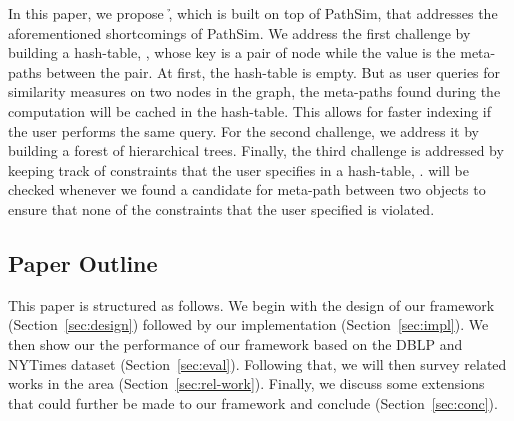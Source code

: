 In this paper, we propose \h, which is built on top of PathSim, that addresses
the aforementioned shortcomings of PathSim. We address the first challenge by
building a hash-table, \mTable, whose key is a pair of node while the value is
the meta-paths between the pair. At first, the hash-table is empty. But as user
queries for similarity measures on two nodes in the graph, the meta-paths found
during the computation will be cached in the hash-table. This allows for faster
indexing if the user performs the same query. For the second challenge, we
address it by building a forest of hierarchical trees. Finally, the third
challenge is addressed by keeping track of constraints that the user specifies
in a hash-table, \cTable. \cTable will be checked whenever we found a candidate
for meta-path between two objects to ensure that none of the constraints that
the user specified is violated.

\subsection{Paper Outline}

This paper is structured as follows. We begin with the design of our framework
(Section~\ref{sec:design}) followed by our implementation
(Section~\ref{sec:impl}). We then show our the performance of our framework
based on the DBLP and NYTimes dataset (Section~\ref{sec:eval}). Following that,
we will then survey related works in the area (Section~\ref{sec:rel-work}).
Finally, we discuss some extensions that could further be made to our framework
and conclude (Section~\ref{sec:conc}).
